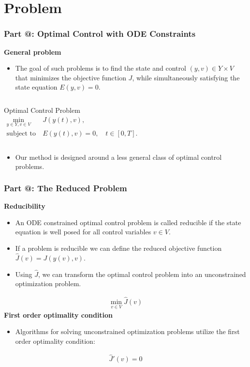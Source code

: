 \documentclass[9pt]{beamer}
\makeatletter
\newcommand*{\rom}[1]{\expandafter\@slowromancap\romannumeral #1@}
\makeatother
\begin{document}
\section{Problem}
\begin{frame}
\frametitle{\textbf{ Part \rom{1}:} Optimal Control with ODE Constraints}
\textbf{General problem}
\begin{itemize}
\item{The goal of such problems is to find the state and control $(y,v)\in Y\times V$ that minimizes the objective function $J$, while simultaneously satisfying the state equation $E(y,v)=0$.}
\end{itemize}
\begin{columns}
\begin{block}{Optimal Control Problem}
\begin{align*}
\min_{y\in Y,v\in V} &J(y(t),v), \\
\textrm{subject to} \ &E(y(t),v)=0,\quad t\in[0,T].
\end{align*}
\end{block}
\end{columns}
\begin{itemize}
\item{Our method is designed around a less general class of optimal control problems.}
\end{itemize}
\end{frame}
\begin{frame}
\frametitle{\textbf{ Part \rom{1}:} The Reduced Problem}
\textbf{Reducibility}
\begin{itemize}
\item{An ODE constrained optimal control problem is called reducible if the state equation is well posed for all control variables $v\in V$.}
\item{If a problem is reducible we can define the reduced objective function $\hat{J}(v) = J(y(v),v)$.}
\item{Using $\hat J$, we can transform the optimal control problem into an unconstrained optimization problem.}
\end{itemize}
\begin{align*}
\min_{v\in V}\hat J (v)
\end{align*}
\textbf{First order optimality condition}
\begin{itemize}
\item{Algorithms for solving unconstrained optimization problems utilize the first order optimality condition:}
\end{itemize}
\begin{align*}
\hat J'(v) = 0
\end{align*}
\end{frame}
\end{document}
